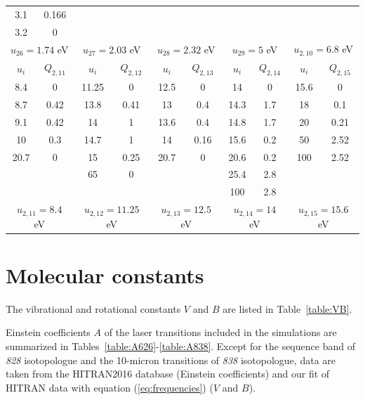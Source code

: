 \documentclass{report}
\begin{document}
\begin{appendices}
\begin{table}
\begin{tabular}{|c|c||c|c||c|c||c|c||c|c|}
3.1  & 0.166  &       &       &       &       &      &      &      &       \\
3.2  & 0      &       &       &       &       &      &      &      &       \\
\multicolumn{2}{|c||}{$u_{26}=1.74$ eV} &
\multicolumn{2}{c||}{$u_{27}=2.03$ eV} &
\multicolumn{2}{c||}{$u_{28}=2.32$ eV} &
\multicolumn{2}{c||}{$u_{29}=5$ eV} &
\multicolumn{2}{c|}{$u_{2,10}=6.8$ eV}\\
\hline
\hline 
$u_i$ & $Q_{2,11}$ & $u_i$ & $Q_{2,12}$ & $u_i$ & $Q_{2,13}$ & $u_i$ & $Q_{2,14}$ & $u_i$ & $Q_{2,15}$ \\                                                                             
\hline
8.4  & 0      & 11.25 & 0     & 12.5  & 0     & 14   & 0    & 15.6 & 0     \\
8.7  & 0.42   & 13.8  & 0.41  & 13    & 0.4   & 14.3 & 1.7  & 18   & 0.1   \\
9.1  & 0.42   & 14    & 1     & 13.6  & 0.4   & 14.8 & 1.7  & 20   & 0.21  \\
10   & 0.3    & 14.7  & 1     & 14    & 0.16  & 15.6 & 0.2  & 50   & 2.52  \\
20.7 & 0      & 15    & 0.25  & 20.7  & 0     & 20.6 & 0.2  & 100  & 2.52  \\
     &        & 65    & 0     &       &       & 25.4 & 2.8  &      &       \\
     &        &       &       &       &       & 100  & 2.8  &      &       \\
\multicolumn{2}{|c||}{$u_{2,11}=8.4$ eV} &
\multicolumn{2}{c||}{$u_{2,12}=11.25$ eV} &
\multicolumn{2}{c||}{$u_{2,13}=12.5$ eV} &
\multicolumn{2}{c||}{$u_{2,14}=14$ eV} &
\multicolumn{2}{c|}{$u_{2,15}=15.6$ eV}\\
\hline 
\end{tabular}
\end{table}


\chapter{Molecular constants}
\label{appendix:molecular_constants}

The vibrational and rotational constants $V$ and $B$ are listed in Table~\ref{table:VB}.

Einstein coefficients $A$ of the laser transitions included in the simulations are summarized in Tables~\ref{table:A626}-\ref{table:A838}. Except for the sequence band of \textit{828} isotopologue and the 10-micron transitions of \textit{838} isotopologue, data are taken from the HITRAN2016 database \cite{Gordon-2022} (Einstein coefficients) and our fit of HITRAN data with equation (\ref{eq:frequencies}) ($V$ and $B$).


\end{appendices}
\end{document}
